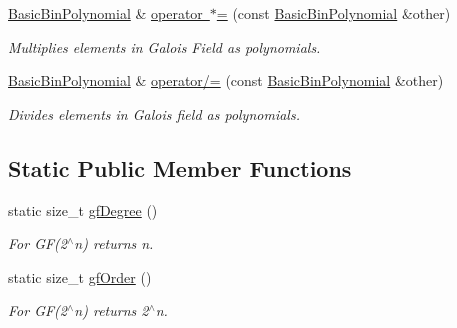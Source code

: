 \begin{DoxyCompactItemize}
\mbox{\hyperlink{class_g_flinalg_1_1_basic_bin_polynomial}{Basic\+Bin\+Polynomial}} \& \mbox{\hyperlink{class_g_flinalg_1_1_basic_bin_polynomial_af0c6fb43360af5dbc4bb82037eda7299}{operator $\ast$=}} (const \mbox{\hyperlink{class_g_flinalg_1_1_basic_bin_polynomial}{Basic\+Bin\+Polynomial}} \&other)
\begin{DoxyCompactList}\small\item\em Multiplies elements in Galois Field as polynomials. \end{DoxyCompactList}\item 
\mbox{\label{class_g_flinalg_1_1_basic_bin_polynomial_a6933900a6f4d5138dff70e2da049ac28}} 
\mbox{\hyperlink{class_g_flinalg_1_1_basic_bin_polynomial}{Basic\+Bin\+Polynomial}} \& \mbox{\hyperlink{class_g_flinalg_1_1_basic_bin_polynomial_a6933900a6f4d5138dff70e2da049ac28}{operator/=}} (const \mbox{\hyperlink{class_g_flinalg_1_1_basic_bin_polynomial}{Basic\+Bin\+Polynomial}} \&other)
\begin{DoxyCompactList}\small\item\em Divides elements in Galois field as polynomials. \end{DoxyCompactList}\end{DoxyCompactItemize}
\subsection*{Static Public Member Functions}
\begin{DoxyCompactItemize}
\item 
\mbox{\label{class_g_flinalg_1_1_basic_bin_polynomial_af1e3807fd9a0ec9fa3a48d8fe29b0996}} 
static size\+\_\+t \mbox{\hyperlink{class_g_flinalg_1_1_basic_bin_polynomial_af1e3807fd9a0ec9fa3a48d8fe29b0996}{gf\+Degree}} ()
\begin{DoxyCompactList}\small\item\em For G\+F(2$^\wedge$n) returns n. \end{DoxyCompactList}\item 
\mbox{\label{class_g_flinalg_1_1_basic_bin_polynomial_a0e4a7bdebbd6f45dd7fbe57001b82e51}} 
static size\+\_\+t \mbox{\hyperlink{class_g_flinalg_1_1_basic_bin_polynomial_a0e4a7bdebbd6f45dd7fbe57001b82e51}{gf\+Order}} ()
\begin{DoxyCompactList}\small\item\em For G\+F(2$^\wedge$n) returns 2$^\wedge$n. \end{DoxyCompactList}\end{DoxyCompactItemize}
